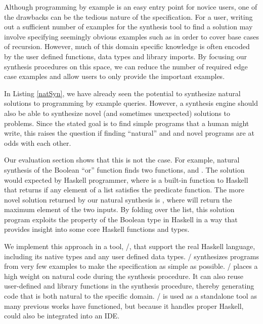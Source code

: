 Although programming by example is an easy entry point for novice users, one of the drawbacks can be the tedious nature of the specification.
For a user, writing out a sufficient number of examples for the synthesis tool to find a solution may involve
  specifying seemingly obvious examples such as \codeinline{[]->[]} in order to cover base cases of recursion.
However, much of this domain specific knowledge is often encoded by the user defined functions, data types and library imports.
By focusing our synthesis procedures on this space, we can reduce the number of required edge case examples and allow users to only provide the important examples.

In Listing \ref{natSyn}, we have already seen the potential to synthesize natural solutions to programming by example queries.
However, a synthesis engine should also be able to synthesize novel (and sometimes unexpected) solutions to problems.
Since the stated goal is to find simple programs that a human might write, this raises the question if finding ``natural'' and and novel programs are at odds with each other.

Our evaluation section shows that this is not the case.
For example, natural synthesis of the Boolean ``or'' function finds two functions,  and .
The  solution would expected by Haskell programmer, where  is a built-in function to Haskell that returns  if any element of a list satisfies the predicate function.
The more novel solution returned by our natural synthesis is , where  will return the maximum element of the two inputs.
By folding over the list, this solution program exploits the  property of the Boolean type in Haskell in a way that provides insight into some core Haskell functions and types.

We implement this approach in a tool, \ourTool/, that support the real Haskell language, including its native types and any user defined data types.
\ourTool/ synthesizes programs from very few examples to make the specification as simple as possible.
\ourTool/ places a high weight on natural code during the synthesis procedure.
It can also reuse user-defined and library functions in the synthesis procedure, thereby generating code that is both natural to the specific domain.
\ourTool/ is used as a standalone tool as many previous works have functioned, but because it handles proper Haskell, could also be integrated into an IDE.

